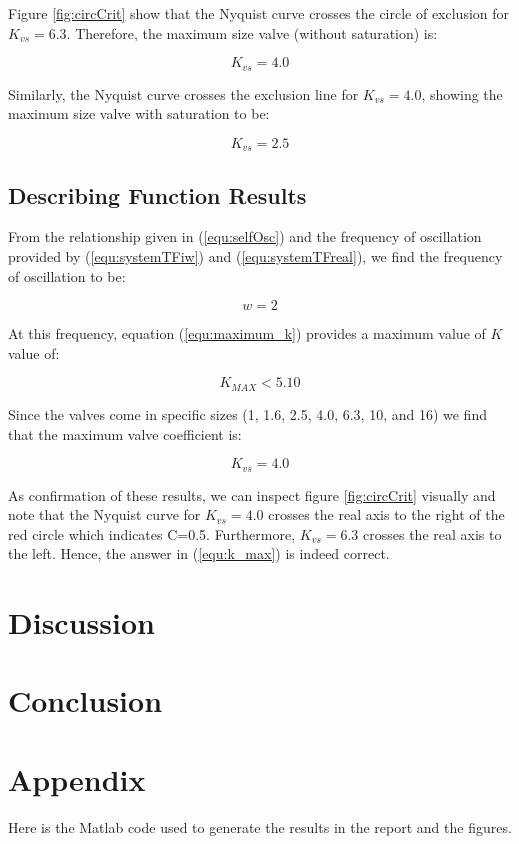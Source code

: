 \documentclass[a4paper, titlepage]{article}
\begin{document}
Figure \ref{fig:circCrit} show that the Nyquist curve crosses the circle of exclusion for $K_{vs}=6.3$.  Therefore, the maximum size valve (without saturation) is:

\begin{equation}
K_{vs} = 4.0
\label{equ:k_max_wo_saturation}
\end{equation}

Similarly, the Nyquist curve crosses the exclusion line for $K_{vs}=4.0$, showing the maximum size valve with saturation to be:

\begin{equation}
K_{vs} = 2.5
\label{equ:k_max_w_saturation}
\end{equation}

\subsection{Describing Function Results}

From the relationship given in (\ref{equ:selfOsc}) and the frequency of oscillation provided by (\ref{equ:systemTFiw}) and (\ref{equ:systemTFreal}), we find the frequency of oscillation to be:

\begin{equation}
w=2
\label{equ:omega_zero}
\end{equation}

At this frequency, equation (\ref{equ:maximum_k}) provides a maximum value of $K$ value of:

\begin{equation}
K_{MAX} < 5.10
\label{equ:k_valid}
\end{equation}

Since the valves come in specific sizes (1, 1.6, 2.5, 4.0, 6.3, 10, and 16) we find that the maximum valve coefficient is:

\begin{equation}
K_{vs} = 4.0
\label{equ:k_max}
\end{equation}

As confirmation of these results, we can inspect figure \ref{fig:circCrit} visually and note that the Nyquist curve for $K_{vs}=4.0$ crosses the real axis to the right of the red circle which indicates C=0.5.  Furthermore, $K_{vs}=6.3$ crosses the real axis to the left.  Hence, the answer in (\ref{equ:k_max}) is indeed correct. 

\section{Discussion}
\section{Conclusion}




\clearpage


\clearpage
\appendix

\section{Appendix}
Here is the Matlab code used to generate the results in the report and the figures.


\end{document}
